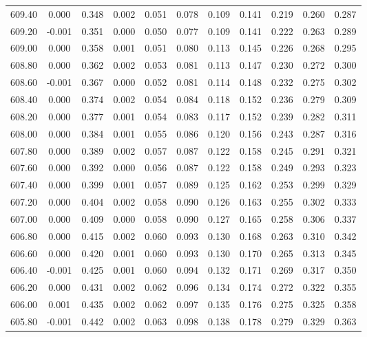 \begin{longtable}{cccccccccc}
    609.40 &  0.000 &  0.348 &  0.002 &  0.051 &  0.078 &  0.109 &  0.141 &  0.219 &  0.260 &  0.287 \\
    609.20 & -0.001 &  0.351 &  0.000 &  0.050 &  0.077 &  0.109 &  0.141 &  0.222 &  0.263 &  0.289 \\
    609.00 &  0.000 &  0.358 &  0.001 &  0.051 &  0.080 &  0.113 &  0.145 &  0.226 &  0.268 &  0.295 \\
    608.80 &  0.000 &  0.362 &  0.002 &  0.053 &  0.081 &  0.113 &  0.147 &  0.230 &  0.272 &  0.300 \\
    608.60 & -0.001 &  0.367 &  0.000 &  0.052 &  0.081 &  0.114 &  0.148 &  0.232 &  0.275 &  0.302 \\
    608.40 &  0.000 &  0.374 &  0.002 &  0.054 &  0.084 &  0.118 &  0.152 &  0.236 &  0.279 &  0.309 \\
    608.20 &  0.000 &  0.377 &  0.001 &  0.054 &  0.083 &  0.117 &  0.152 &  0.239 &  0.282 &  0.311 \\
    608.00 &  0.000 &  0.384 &  0.001 &  0.055 &  0.086 &  0.120 &  0.156 &  0.243 &  0.287 &  0.316 \\
    607.80 &  0.000 &  0.389 &  0.002 &  0.057 &  0.087 &  0.122 &  0.158 &  0.245 &  0.291 &  0.321 \\
    607.60 &  0.000 &  0.392 &  0.000 &  0.056 &  0.087 &  0.122 &  0.158 &  0.249 &  0.293 &  0.323 \\
    607.40 &  0.000 &  0.399 &  0.001 &  0.057 &  0.089 &  0.125 &  0.162 &  0.253 &  0.299 &  0.329 \\
    607.20 &  0.000 &  0.404 &  0.002 &  0.058 &  0.090 &  0.126 &  0.163 &  0.255 &  0.302 &  0.333 \\
    607.00 &  0.000 &  0.409 &  0.000 &  0.058 &  0.090 &  0.127 &  0.165 &  0.258 &  0.306 &  0.337 \\
    606.80 &  0.000 &  0.415 &  0.002 &  0.060 &  0.093 &  0.130 &  0.168 &  0.263 &  0.310 &  0.342 \\
    606.60 &  0.000 &  0.420 &  0.001 &  0.060 &  0.093 &  0.130 &  0.170 &  0.265 &  0.313 &  0.345 \\
    606.40 & -0.001 &  0.425 &  0.001 &  0.060 &  0.094 &  0.132 &  0.171 &  0.269 &  0.317 &  0.350 \\
    606.20 &  0.000 &  0.431 &  0.002 &  0.062 &  0.096 &  0.134 &  0.174 &  0.272 &  0.322 &  0.355 \\
    606.00 &  0.001 &  0.435 &  0.002 &  0.062 &  0.097 &  0.135 &  0.176 &  0.275 &  0.325 &  0.358 \\
    605.80 & -0.001 &  0.442 &  0.002 &  0.063 &  0.098 &  0.138 &  0.178 &  0.279 &  0.329 &  0.363 \\

\end{longtable}
